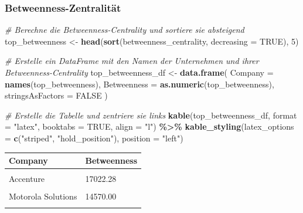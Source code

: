\documentclass[
]{article}
\newenvironment{Shaded}{\begin{snugshade}}{\end{snugshade}}
\newcommand{\AttributeTok}[1]{\textcolor[rgb]{0.13,0.29,0.53}{#1}}
\newcommand{\CommentTok}[1]{\textcolor[rgb]{0.56,0.35,0.01}{\textit{#1}}}
\newcommand{\ConstantTok}[1]{\textcolor[rgb]{0.56,0.35,0.01}{#1}}
\newcommand{\DecValTok}[1]{\textcolor[rgb]{0.00,0.00,0.81}{#1}}
\newcommand{\FunctionTok}[1]{\textcolor[rgb]{0.13,0.29,0.53}{\textbf{#1}}}
\newcommand{\NormalTok}[1]{#1}
\newcommand{\OtherTok}[1]{\textcolor[rgb]{0.56,0.35,0.01}{#1}}
\newcommand{\SpecialCharTok}[1]{\textcolor[rgb]{0.81,0.36,0.00}{\textbf{#1}}}
\newcommand{\StringTok}[1]{\textcolor[rgb]{0.31,0.60,0.02}{#1}}
\begin{document}
\subsubsection{Betweenness-Zentralität}\label{betweenness-zentralituxe4t}

\begin{Shaded}
\begin{Highlighting}[]
\CommentTok{\# Berechne die Betweenness{-}Centrality und sortiere sie absteigend}
\NormalTok{top\_betweenness }\OtherTok{\textless{}{-}} \FunctionTok{head}\NormalTok{(}\FunctionTok{sort}\NormalTok{(betweenness\_centrality, }\AttributeTok{decreasing =} \ConstantTok{TRUE}\NormalTok{), }\DecValTok{5}\NormalTok{)}

\CommentTok{\# Erstelle ein DataFrame mit den Namen der Unternehmen und ihrer Betweenness{-}Centrality}
\NormalTok{top\_betweenness\_df }\OtherTok{\textless{}{-}} \FunctionTok{data.frame}\NormalTok{(}
  \AttributeTok{Company =} \FunctionTok{names}\NormalTok{(top\_betweenness),}
  \AttributeTok{Betweenness =} \FunctionTok{as.numeric}\NormalTok{(top\_betweenness),}
  \AttributeTok{stringsAsFactors =} \ConstantTok{FALSE}
\NormalTok{)}

\CommentTok{\# Erstelle die Tabelle und zentriere sie links}
\FunctionTok{kable}\NormalTok{(top\_betweenness\_df, }\AttributeTok{format =} \StringTok{"latex"}\NormalTok{, }\AttributeTok{booktabs =} \ConstantTok{TRUE}\NormalTok{, }\AttributeTok{align =} \StringTok{"l"}\NormalTok{) }\SpecialCharTok{\%\textgreater{}\%}
\FunctionTok{kable\_styling}\NormalTok{(}\AttributeTok{latex\_options =} \FunctionTok{c}\NormalTok{(}\StringTok{"striped"}\NormalTok{, }\StringTok{"hold\_position"}\NormalTok{), }\AttributeTok{position =} \StringTok{"left"}\NormalTok{)}
\end{Highlighting}
\end{Shaded}

\begin{tabular}{ll}
\toprule
Company & Betweenness\\
\midrule
\cellcolor{gray!10}{Saama Technologies Inc} & \cellcolor{gray!10}{25426.13}\\
Accenture & 17022.28\\
\cellcolor{gray!10}{IBM} & \cellcolor{gray!10}{14640.00}\\
Motorola Solutions & 14570.00\\
\cellcolor{gray!10}{ManTech} & \cellcolor{gray!10}{9039.75}\\
\bottomrule
\end{tabular}
\end{document}
